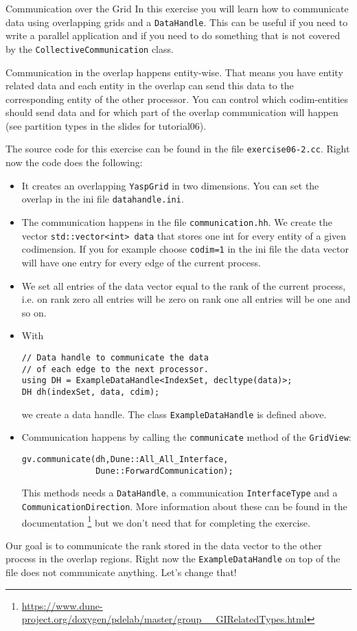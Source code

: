 \documentclass[12pt,a4paper]{article}
\begin{document}
\begin{Exercise}{Communication over the Grid}
  In this exercise you will learn how to communicate data using overlapping
  grids and a \lstinline{DataHandle}. This can be useful if you need to write a
  parallel application and if you need to do something that is not covered by
  the \lstinline{CollectiveCommunication} class.

  Communication in the overlap happens entity-wise. That means you have entity
  related data and each entity in the overlap can send this data to the
  corresponding entity of the other processor. You can control which
  codim-entities should send data and for which part of the overlap
  communication will happen (see partition types in the slides for tutorial06).

  The source code for this exercise can be found in the file
  \lstinline{exercise06-2.cc}. Right now the code does the following:
  \begin{itemize}
  \item It creates an overlapping \lstinline{YaspGrid} in two
    dimensions. You can set the overlap in the ini file
    \lstinline{datahandle.ini}.
  \item The communication happens in the file
    \lstinline{communication.hh}.  We create the vector
    \lstinline{std::vector<int> data} that stores one int for every
    entity of a given codimension. If you for example choose
    \lstinline{codim=1} in the ini file the data vector will have one
    entry for every edge of the current process.
  \item We set all entries of the data vector equal to the rank of the
    current process, i.e. on rank zero all entries will be zero on
    rank one all entries will be one and so on.
  \item With
    \begin{lstlisting}
// Data handle to communicate the data
// of each edge to the next processor.
using DH = ExampleDataHandle<IndexSet, decltype(data)>;
DH dh(indexSet, data, cdim);
    \end{lstlisting}
    we create a data handle. The class \lstinline{ExampleDataHandle}
    is defined above.
  \item Communication happens by calling the \lstinline{communicate}
    method of the \lstinline{GridView}:
    \begin{lstlisting}
gv.communicate(dh,Dune::All_All_Interface,
               Dune::ForwardCommunication);
    \end{lstlisting}
    This methods needs a \lstinline{DataHandle}, a communication
    \lstinline{InterfaceType} and a
    \lstinline{CommunicationDirection}. More information about these
    can be found in the documentation \footnote{\url{https://www.dune-project.org/doxygen/pdelab/master/group__GIRelatedTypes.html}}
    but we don't need that for completing the exercise.
  \end{itemize}
  Our goal is to communicate the rank stored in the data vector to the
  other process in the overlap regions. Right now the
  \lstinline{ExampleDataHandle} on top of the file does not
  communicate anything. Let's change that!


\end{Exercise}
\end{document}
